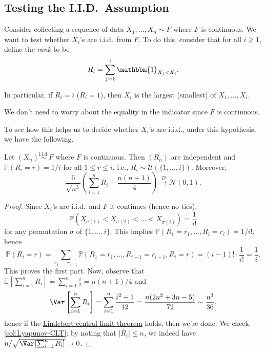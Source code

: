 \subsection{Testing the I.I.D.\ Assumption}
Consider collecting a sequence of data \(X_1, \dots , X_n \sim F\) where \(F\) is continuous. We want to test whether \(X_i\)'s are i.i.d.\ from \(F\). To do this, consider that for all \(i \geq 1\), define the \emph{rank} to be
\[
	R_i = \sum_{j=1}^{i} \mathbbm{1}_{X_j < X_i}.
\]

\begin{eg}
	In particular, if \(R_i = i\) (\(R_i = 1\)), then \(X_i\) is the largest (smallest) of \(X_1, \dots , X_i\).
\end{eg}

\begin{note}
	We don't need to worry about the equality in the indicator since \(F\) is continuous.
\end{note}

To see how this helps us to decide whether \(X_i\)'s are i.i.d., under this hypothesis, we have the following.

\begin{theorem}\label{thm:rank}
	Let \((X_n) \overset{\text{i.i.d.} }{\sim } F\) where \(F\) is continuous. Then \((R_n)\) are independent and \(\mathbb{P} (R_i = r) = 1 / i\) for all \(1 \leq r \leq i\), i.e., \(R_i \sim \mathcal{U} (\{ 1, \dots , i \} )\). Moreover,
	\[
		\frac{6}{\sqrt{n^3} } \left( \sum_{i=1}^{n} R_i - \frac{n(n+1)}{4} \right) \overset{D}{\to} \mathcal{N} (0, 1).
	\]
\end{theorem}
\begin{proof}
	Since \(X_i\)'s are i.i.d.\ and \(F\) it continues (hence no ties),
	\[
		\mathbb{P} (X_{\sigma (1)} < X_{\sigma (2)} < \dots < X_{\sigma (i)})
		= \frac{1}{i!}
	\]
	for any permutation \(\sigma \) of \(\{ 1, \dots , i \} \). This implies \(\mathbb{P} (R_1 = r_1, \dots , R_i = r_i) = 1 / i!\), hence
	\[
		\mathbb{P} (R_i = r)
		= \sum_{r_1, \dots , r_{i-1}} \mathbb{P} (R_1 = r_1 , \dots , R_{i-1} = r_{i-1} , R_i = r)
		= (i - 1)! \cdot \frac{1}{i!}
		= \frac{1}{i}.
	\]
	This proves the first part. Now, observe that \(\mathbb{E}_{}\left[\sum_{i=1}^{n} R_i \right] = \sum_{i=1}^{n} \frac{i}{2} = n (n + 1) / 4\) and
	\[
		\Var_{}\left[\sum_{i=1}^{n} R_i \right]
		= \sum_{i=1}^{n} \frac{i^2 - 1}{12}
		= \frac{n (2 n^{2} + 3 n - 5)}{72}
		\sim \frac{n^3}{36},
	\]
	hence if the \hyperref[thm:Lindeberg-CLT]{Lindebert central limit theorem} holds, then we're done. We check \autoref{col:Lyapunov-CLT}: by noting that \(\lvert R_i \rvert \leq n\), we indeed have \(n / \sqrt{\Var_{}[\sum_{i=1}^{n} R_i]} \to 0\).
\end{proof}


